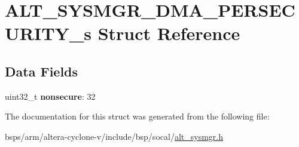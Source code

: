 \hypertarget{structALT__SYSMGR__DMA__PERSECURITY__s}{}\section{A\+L\+T\+\_\+\+S\+Y\+S\+M\+G\+R\+\_\+\+D\+M\+A\+\_\+\+P\+E\+R\+S\+E\+C\+U\+R\+I\+T\+Y\+\_\+s Struct Reference}
\label{structALT__SYSMGR__DMA__PERSECURITY__s}
\subsection*{Data Fields}
\begin{DoxyCompactItemize}
\item 
\mbox{\label{structALT__SYSMGR__DMA__PERSECURITY__s_ac0d6aa19e8eefb327a2f85b0082b3cfb}} 
uint32\+\_\+t {\bfseries nonsecure}\+: 32
\end{DoxyCompactItemize}


The documentation for this struct was generated from the following file\+:\begin{DoxyCompactItemize}
\item 
bsps/arm/altera-\/cyclone-\/v/include/bsp/socal/\mbox{\hyperlink{alt__sysmgr_8h}{alt\+\_\+sysmgr.\+h}}\end{DoxyCompactItemize}
